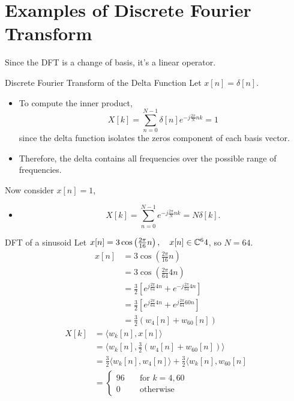 \documentclass[../main.tex]{subfiles}
\begin{document}
\section{Examples of Discrete Fourier Transform}
\begin{remark}
    Since the DFT is a change of basis, it's a linear operator.
\end{remark}
\begin{pbox}{Discrete Fourier Transform of the Delta Function}
Let $x[n]=\delta[n]$.
\begin{itemize}
    \item To compute the inner product, \[
    X[k]=\sum_{n=0}^{N-1}\delta[n]e^{-j\frac{2\pi}{N}nk} = 1
    \]
    since the delta function isolates the zeros component of each basis vector.
    \item Therefore, the delta contains all frequencies over the possible range of frequencies. 
    \end{itemize}
    Now consider $x[n]=1$, \begin{itemize}
        \item \[
        X[k]=\sum_{n=0}^{N-1}e^{-j\frac{2\pi}{N}nk} = N\delta[k].
        \]
    \end{itemize}
\end{pbox}
\begin{pbox}{DFT of a sinusoid}
Let $x[n]=3\cos\left(\frac{2\pi}{16}n\right), \quad x[n]\in \mathbb{C}^64$, so $N=64$. 
\begin{align*}
    x[n] &= 3\cos\left(\frac{2\pi}{16}n\right)\\
    &= 3\cos \left(\frac{2\pi}{64}4n\right)\\
    &= \frac{3}{2}\left[e^{j\frac{2\pi}{64}4n}+e^{-j\frac{2\pi}{64}4n}\right]\\
    &= \frac{3}{2}\left[e^{j\frac{2\pi}{64}4n}+e^{j\frac{2\pi}{64}60n}\right]\\
    &=\frac{3}{2}(w_4[n]+w_{60}[n])
\end{align*}
    \begin{align*}
        X[k] &= \langle w_k[n], x[n]\rangle\\
        &=\langle w_k[n],\frac{3}{2}(w_4[n]+w_{60}[n])\rangle \\
        &=\frac{3}{2}\langle w_k[n],w_4[n]\rangle + \frac{3}{2}\langle w_k[n],w_{60}[n]\\
        &= \begin{cases}
            96 \quad &\text{for $k=4,60$}\\
            0\quad&\text{otherwise}
        \end{cases}
    \end{align*}
\end{pbox}
\end{document}
